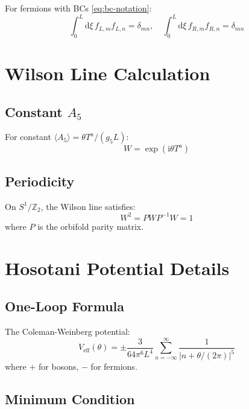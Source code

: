 \documentclass[11pt,a4paper]{article}
\newcommand{\dd}{\mathrm{d}}
\newcommand{\ii}{\mathrm{i}}
\begin{document}
For fermions with BCs \eqref{eq:bc-notation}:
\begin{equation}
\int_0^L \dd\xi\, f_{L,m} f_{L,n} = \delta_{mn}, \quad
\int_0^L \dd\xi\, f_{R,m} f_{R,n} = \delta_{mn}
\label{eq:fermion-orthog}
\end{equation}

\section{Wilson Line Calculation}
\label{app:wilson}

\subsection{Constant $A_5$}

For constant $\langle A_5 \rangle = \theta T^a/(g_5 L)$:
\begin{equation}
W = \exp\left(\ii \theta T^a\right)
\label{eq:wilson-const}
\end{equation}

\subsection{Periodicity}

On $S^1/\mathbb{Z}_2$, the Wilson line satisfies:
\begin{equation}
W^2 = P W P^{-1} W = 1
\label{eq:wilson-periodicity}
\end{equation}
where $P$ is the orbifold parity matrix.

\section{Hosotani Potential Details}
\label{app:hosotani}

\subsection{One-Loop Formula}

The Coleman-Weinberg potential:
\begin{equation}
V_{\text{eff}}(\theta) = \pm \frac{3}{64\pi^6 L^4} \sum_{n=-\infty}^{\infty} \frac{1}{|n + \theta/(2\pi)|^5}
\label{eq:cw-potential}
\end{equation}
where $+$ for bosons, $-$ for fermions.

\subsection{Minimum Condition}
\end{document}
